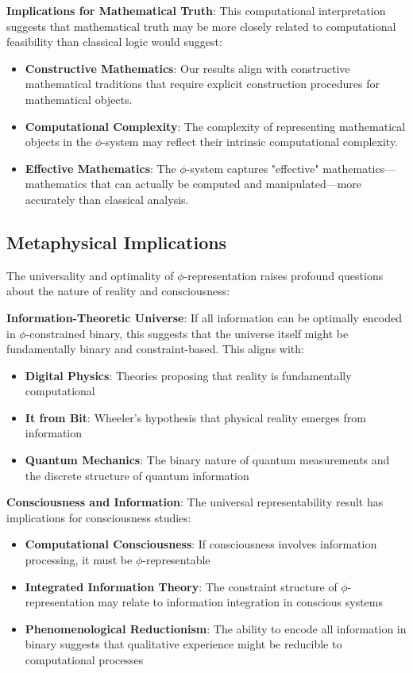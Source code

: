 \documentclass[12pt,letterpaper]{article}
\begin{document}
\textbf{Implications for Mathematical Truth}: This computational interpretation suggests that mathematical truth may be more closely related to computational feasibility than classical logic would suggest:

\begin{itemize}
\item \textbf{Constructive Mathematics}: Our results align with constructive mathematical traditions that require explicit construction procedures for mathematical objects.

\item \textbf{Computational Complexity}: The complexity of representing mathematical objects in the $\phi$-system may reflect their intrinsic computational complexity.

\item \textbf{Effective Mathematics}: The $\phi$-system captures "effective" mathematics—mathematics that can actually be computed and manipulated—more accurately than classical analysis.
\end{itemize}

\subsection{Metaphysical Implications}

The universality and optimality of $\phi$-representation raises profound questions about the nature of reality and consciousness:

\textbf{Information-Theoretic Universe}: If all information can be optimally encoded in $\phi$-constrained binary, this suggests that the universe itself might be fundamentally binary and constraint-based. This aligns with:

\begin{itemize}
\item \textbf{Digital Physics}: Theories proposing that reality is fundamentally computational
\item \textbf{It from Bit}: Wheeler's hypothesis that physical reality emerges from information
\item \textbf{Quantum Mechanics}: The binary nature of quantum measurements and the discrete structure of quantum information
\end{itemize}

\textbf{Consciousness and Information}: The universal representability result has implications for consciousness studies:

\begin{itemize}
\item \textbf{Computational Consciousness}: If consciousness involves information processing, it must be $\phi$-representable
\item \textbf{Integrated Information Theory}: The constraint structure of $\phi$-representation may relate to information integration in conscious systems
\item \textbf{Phenomenological Reductionism}: The ability to encode all information in binary suggests that qualitative experience might be reducible to computational processes
\end{itemize}
\end{document}
